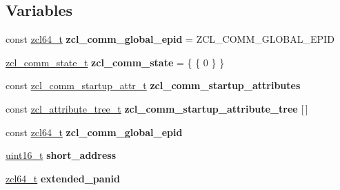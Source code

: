 \subsection*{Variables}
\begin{DoxyCompactItemize}
\item 
\hypertarget{group__zcl__commissioning_gaf8ec8c74f3638336b9a1a23e2b88a7ba}{const \hyperlink{group__zcl__64_ga2e906cb47fc172ae60da5178075dd3c7}{zcl64\-\_\-t} {\bfseries zcl\-\_\-comm\-\_\-global\-\_\-epid} = Z\-C\-L\-\_\-\-C\-O\-M\-M\-\_\-\-G\-L\-O\-B\-A\-L\-\_\-\-E\-P\-I\-D}\label{group__zcl__commissioning_gaf8ec8c74f3638336b9a1a23e2b88a7ba}

\item 
\hypertarget{group__zcl__commissioning_ga19d5f58d61bf7ad0d29386bc11aa48ae}{\hyperlink{structzcl__comm__state__t}{zcl\-\_\-comm\-\_\-state\-\_\-t} {\bfseries zcl\-\_\-comm\-\_\-state} = \{ \{ 0 \} \}}\label{group__zcl__commissioning_ga19d5f58d61bf7ad0d29386bc11aa48ae}

\item 
\hypertarget{group__zcl__commissioning_gaa88e1b649cac11f8c31f63305ad3ca2d}{const \hyperlink{structzcl__comm__startup__attr__t}{zcl\-\_\-comm\-\_\-startup\-\_\-attr\-\_\-t} {\bfseries zcl\-\_\-comm\-\_\-startup\-\_\-attributes}}\label{group__zcl__commissioning_gaa88e1b649cac11f8c31f63305ad3ca2d}

\item 
const \hyperlink{structzcl__attribute__tree__t}{zcl\-\_\-attribute\-\_\-tree\-\_\-t} {\bfseries zcl\-\_\-comm\-\_\-startup\-\_\-attribute\-\_\-tree} \mbox{[}$\,$\mbox{]}
\item 
\hypertarget{group__zcl__commissioning_gaf8ec8c74f3638336b9a1a23e2b88a7ba}{const \hyperlink{group__zcl__64_ga2e906cb47fc172ae60da5178075dd3c7}{zcl64\-\_\-t} {\bfseries zcl\-\_\-comm\-\_\-global\-\_\-epid}}\label{group__zcl__commissioning_gaf8ec8c74f3638336b9a1a23e2b88a7ba}

\item 
\hypertarget{group__zcl__commissioning_ga46b7cb3df8b01ef7189662d2646332a6}{\hyperlink{group__hal_ga5a8b2dc9e45a9ee81a94ef304fb62505}{uint16\-\_\-t} {\bfseries short\-\_\-address}}\label{group__zcl__commissioning_ga46b7cb3df8b01ef7189662d2646332a6}

\item 
\hypertarget{group__zcl__commissioning_ga69dbf2aa384fc28a2d4a1a032cf2857f}{\hyperlink{group__zcl__64_ga2e906cb47fc172ae60da5178075dd3c7}{zcl64\-\_\-t} {\bfseries extended\-\_\-panid}}\label{group__zcl__commissioning_ga69dbf2aa384fc28a2d4a1a032cf2857f}


\end{DoxyCompactItemize}
